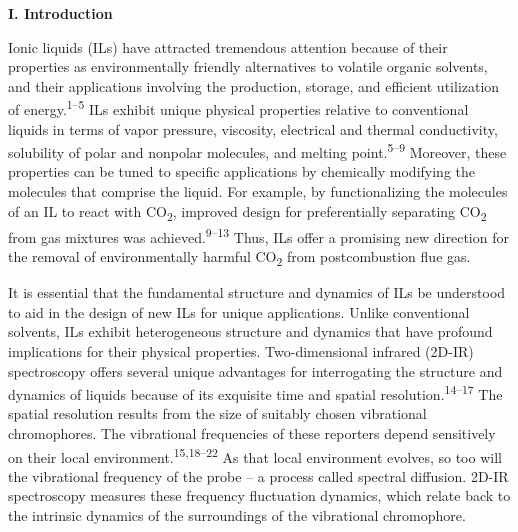 \documentclass[]{article}
\begin{document}
\textbf{I. Introduction}

Ionic liquids (ILs) have attracted tremendous attention because of their
properties as environmentally friendly alternatives to volatile organic
solvents, and their applications involving the production, storage, and
efficient utilization of energy.\textsuperscript{1--5} ILs exhibit
unique physical properties relative to conventional liquids in terms of
vapor pressure, viscosity, electrical and thermal conductivity,
solubility of polar and nonpolar molecules, and melting
point.\textsuperscript{5--9} Moreover, these properties can be tuned to
specific applications by chemically modifying the molecules that
comprise the liquid. For example, by functionalizing the molecules of an
IL to react with CO\textsubscript{2}, improved design for preferentially
separating CO\textsubscript{2} from gas mixtures was
achieved.\textsuperscript{9--13} Thus, ILs offer a promising new
direction for the removal of environmentally harmful CO\textsubscript{2}
from postcombustion flue gas.

It is essential that the fundamental structure and dynamics of ILs be
understood to aid in the design of new ILs for unique applications.
Unlike conventional solvents, ILs exhibit heterogeneous structure and
dynamics that have profound implications for their physical properties.
Two-dimensional infrared (2D-IR) spectroscopy offers several unique
advantages for interrogating the structure and dynamics of liquids
because of its exquisite time and spatial
resolution.\textsuperscript{14--17} The spatial resolution results from
the size of suitably chosen vibrational chromophores. The vibrational
frequencies of these reporters depend sensitively on their local
environment.\textsuperscript{15,18--22} As that local environment
evolves, so too will the vibrational frequency of the probe -- a process
called spectral diffusion. 2D-IR spectroscopy measures these frequency
fluctuation dynamics, which relate back to the intrinsic dynamics of the
surroundings of the vibrational chromophore.
\end{document}
